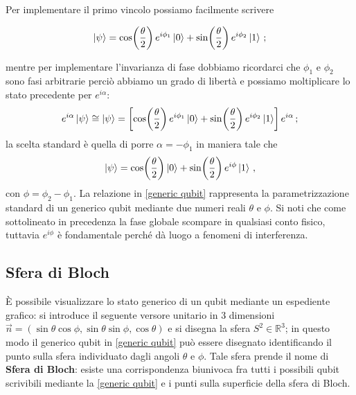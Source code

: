 \noindent Per implementare il primo vincolo possiamo facilmente scrivere

\begin{equation*}
    \ket{\psi} = \cos \! \left( \frac{\theta}{2} \right) e^{i \phi_1} \ket{0} + \sin \! \left( \frac{\theta}{2} \right) e^{i \phi_2} \ket{1} \, ;
\end{equation*}

\noindent mentre per implementare l'invarianza di fase dobbiamo ricordarci che $\phi_1$ e $\phi_2$ sono fasi arbitrarie perciò abbiamo un grado di libertà e possiamo moltiplicare lo stato precedente per $e^{i \alpha}$:
\begin{equation*}
    e^{i \alpha} \ket{\psi} \cong \ket{\psi} = \left[ \cos \! \left( \frac{\theta}{2} \right) e^{i \phi_1} \ket{0} + \sin \! \left( \frac{\theta}{2} \right) e^{i \phi_2} \ket{1} \right] e^{i \alpha} \, ;
\end{equation*}
\noindent la scelta standard è quella di porre $\alpha = - \phi_1$ in maniera tale che
\begin{equation}\label{generic qubit}
    \ket{\psi} = \cos \! \left( \frac{\theta}{2} \right) \ket{0} + \sin \! \left( \frac{\theta}{2} \right) e^{i \phi} \ket{1} \, ,
\end{equation}
con $\phi=\phi_2-\phi_1$. La relazione in \eqref{generic qubit} rappresenta la parametrizzazione standard di un generico qubit mediante due numeri reali $\theta$ e $\phi$. Si noti che come sottolineato in precedenza la fase globale scompare in qualsiasi conto fisico, tuttavia $e^{i \phi}$ è fondamentale perché dà luogo a fenomeni di interferenza. 

\subsection{Sfera di Bloch}\label{subsec:Bloch}
È possibile visualizzare lo stato generico di un qubit mediante un espediente grafico: si introduce il seguente versore unitario in 3 dimensioni $\vec{n} = (\sin \theta \cos \phi, \sin \theta \sin \phi, \cos \theta)$ e si disegna la sfera $S^2 \in \mathbb{R}^3$; in questo modo il generico qubit in \eqref{generic qubit} può essere disegnato identificando il punto sulla sfera individuato dagli angoli $\theta$ e $\phi$. Tale sfera prende il nome di \textbf{Sfera di Bloch}: esiste una corrispondenza biunivoca fra tutti i possibili qubit scrivibili mediante la \eqref{generic qubit} e i punti sulla superficie della sfera di Bloch. 

